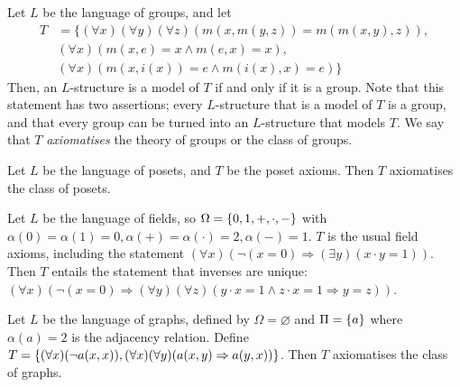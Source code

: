 \begin{example}
    Let \( L \) be the language of groups, and let
    \begin{align*}
        T &= \{(\forall x)(\forall y)(\forall z)(m(x,m(y,z)) = m(m(x,y), z)), \\
        &(\forall x)(m(x,e) = x \wedge m(e,x) = x), \\
        &(\forall x)(m(x,i(x)) = e \wedge m(i(x),x) = e)\}
    \end{align*}
    Then, an \( L \)-structure is a model of \( T \) if and only if it is a group.
    Note that this statement has two assertions; every \( L \)-structure that is a model of \( T \) is a group, and that every group can be turned into an \( L \)-structure that models \( T \).
    We say that \( T \) \emph{axiomatises} the theory of groups or the class of groups.
\end{example}
\begin{example}
    Let \( L \) be the language of posets, and \( T \) be the poset axioms.
    Then \( T \) axiomatises the class of posets.
\end{example}
\begin{example}
    Let \( L \) be the language of fields, so \( \Omega = \qty{0, 1, +, \cdot, -} \) with \( \alpha(0) = \alpha(1) = 0, \alpha(+) = \alpha(\cdot) = 2, \alpha(-) = 1 \).
    \( T \) is the usual field axioms, including the statement \( (\forall x)(\neg (x = 0) \Rightarrow (\exists y)(x \cdot y = 1)) \).
    Then \( T \) entails the statement that inverses are unique: \( (\forall x)(\neg (x = 0) \Rightarrow (\forall y)(\forall z) (y \cdot x = 1 \wedge z \cdot x = 1 \Rightarrow y = z)) \).
\end{example}
\begin{example}
    Let \( L \) be the language of graphs, defined by \( \Omega = \varnothing \) and \( \Pi = \qty{a} \) where \( \alpha(a) = 2 \) is the adjacency relation.
    Define \( T = \qty{(\forall x)(\neg a(x,x)), (\forall x)(\forall y)(a(x,y) \Rightarrow a(y,x))} \).
    Then \( T \) axiomatises the class of graphs.
\end{example}

